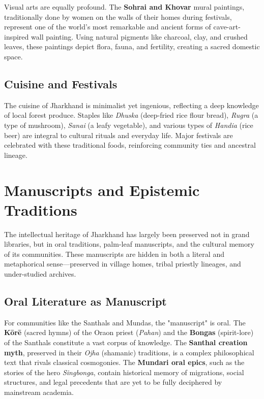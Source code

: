 \documentclass{article}
\begin{document}
Visual arts are equally profound. The \textbf{Sohrai and Khovar} mural paintings, traditionally done by women on the walls of their homes during festivals, represent one of the world's most remarkable and ancient forms of cave-art-inspired wall painting. Using natural pigments like charcoal, clay, and crushed leaves, these paintings depict flora, fauna, and fertility, creating a sacred domestic space.

\subsection{Cuisine and Festivals}
The cuisine of Jharkhand is minimalist yet ingenious, reflecting a deep knowledge of local forest produce. Staples like \textit{Dhuska} (deep-fried rice flour bread), \textit{Rugra} (a type of mushroom), \textit{Sanai} (a leafy vegetable), and various types of \textit{Handia} (rice beer) are integral to cultural rituals and everyday life. Major festivals are celebrated with these traditional foods, reinforcing community ties and ancestral lineage.

\newpage

\section{Manuscripts and Epistemic Traditions}
The intellectual heritage of Jharkhand has largely been preserved not in grand libraries, but in oral traditions, palm-leaf manuscripts, and the cultural memory of its communities. These manuscripts are hidden in both a literal and metaphorical sense—preserved in village homes, tribal priestly lineages, and under-studied archives.

\subsection{Oral Literature as Manuscript}
For communities like the Santhals and Mundas, the "manuscript" is oral. The \textbf{Kōrē} (sacred hymns) of the Oraon priest (\textit{Pahan}) and the \textbf{Bongas} (spirit-lore) of the Santhals constitute a vast corpus of knowledge. The \textbf{Santhal creation myth}, preserved in their \textit{Ojha} (shamanic) traditions, is a complex philosophical text that rivals classical cosmogonies. The \textbf{Mundari oral epics}, such as the stories of the hero \textit{Singbonga}, contain historical memory of migrations, social structures, and legal precedents that are yet to be fully deciphered by mainstream academia.
\end{document}
